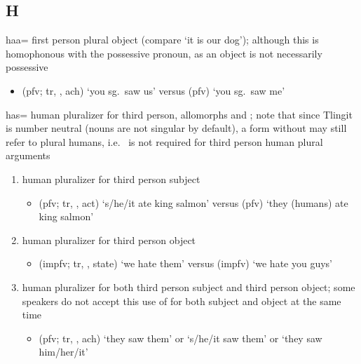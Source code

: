 \documentclass[12pt,letterpaper,oneside,article]{memoir}
\begin{document}
\subsection{H}\label{sec:alphalist-h}
\begin{morphdesc}[resume*=alphalist]
\item[haa=]
	first person plural object
	(compare  ‘it is our dog’);
	although this is homophonous with the possessive pronoun,
		 as an object is not necessarily possessive
	\begin{itemize}
	\item	{} (pfv; tr, , ach) ‘you sg.\ saw us’\newline
		versus  (pfv) ‘you sg.\ saw me’
	\end{itemize}

\item[has=]
	human pluralizer for third person, allomorphs  and ;
	note that since Tlingit is number neutral (nouns are not singular by default),
		a form without  may still refer to plural humans,
		i.e.\  is not required for third person human plural arguments
	\begin{enumerate}
	\item	human pluralizer for third person subject
		\begin{itemize}
		\item	{} (pfv; tr, ,  act) ‘s/he/it ate king salmon’\newline
			versus  (pfv) ‘they (humans) ate king salmon’
		\end{itemize}
	\item	human pluralizer for third person object
		\begin{itemize}
		\item	{} (impfv; tr, ,  state) ‘we hate them’\newline
			versus  (impfv) ‘we hate you guys’
		\end{itemize}
	\item	human pluralizer for both third person subject and third person object;
		some speakers do not accept this use of 
			for both subject and object at the same time
		\begin{itemize}
		\item	{} (pfv; tr, , ach) ‘they saw them’
			or ‘s/he/it saw them’ or ‘they saw him/her/it’
		\end{itemize}
	\end{enumerate}
\end{morphdesc}
\end{document}
